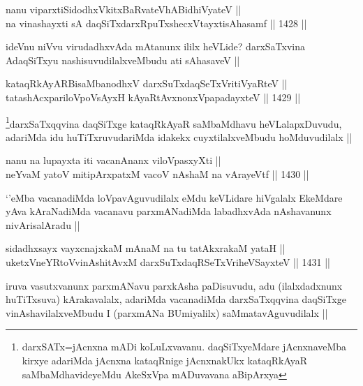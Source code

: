 
\begin{shl}
nanu viparxtiSidodhxVkitxBaRvateVhABidhiVyateV || \\
na vinashayxti sA daqSiTxdarxRpuTxshecxVtayxtisAhasamf ||  1428 ||  
\end{shl}

\begin{artha}
ideVnu niVvu virudadhxvAda mAtanunx ililx heVLide? darxSaTxvina AdaqSiTxyu nashisuvudilalxveMbudu ati sAhasaveV ||
\end{artha}


\begin{shl}
kataqRkAyARBisaMbanodhxV darxSuTxdaqSeTxVritiVyaRteV || \\
tatashAcxpariloVpoV\s sAyxH kAyaRtAvxnonxVpapadayxteV ||  1429 ||  
\end{shl}

\begin{artha}
\footnote{darxSATx=jAcnxna mADi koLuLxvavanu. daqSiTxyeMdare jAcnxnaveMba kirxye adariMda jAcnxna kataqRnige jAcnxnakUkx kataqRkAyaR saMbaMdhavideyeMdu AkeSxVpa mADuvavana aBipArxya}darxSaTxqqvina daqSiTxge kataqRkAyaR saMbaMdhavu heVLalapxDuvudu, adariMda idu huTiTxruvudariMda idakekx cuyxtilalxveMbudu hoMduvudilalx ||
\end{artha}


\begin{shl}
nanu na lupayxta iti vacanAnanx viloVpasxyXti || \\
neYvaM yatoV mitipArxpatxM vacoV nAshaM na vArayeVtf ||  1430 ||  
\end{shl}

\begin{artha}
`\stext'eMba vacanadiMda loVpavAguvudilalx eMdu keVLidare hiVgalalx EkeMdare yAva kAraNadiMda vacanavu parxmANadiMda labadhxvAda nAshavanunx nivArisalAradu ||
\end{artha}


\begin{shl}
sidadhxsayx vayxcnajxkaM mAnaM na tu tatAkxrakaM yataH || \\
uketxVneYRtoV\s vinAshitAvxM darxSuTxdaqRSeTxVriheVSayxteV ||  1431 ||  
\end{shl}

\begin{artha}
iruva vasutxvanunx parxmANavu parxkAsha paDisuvudu, adu (ilalxdadxnunx huTiTxsuva) kArakavalalx, adariMda vacanadiMda darxSaTxqqvina daqSiTxge vinAshavilalxveMbudu I (parxmANa BUmiyalilx) saMmatavAguvudilalx ||
\end{artha}

